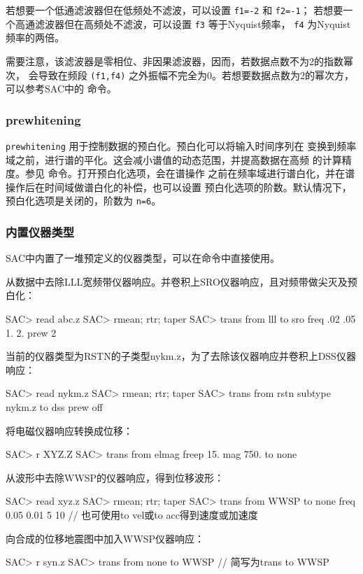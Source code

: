 若想要一个低通滤波器但在低频处不滤波，可以设置 \texttt{f1=-2} 和 \texttt{f2=-1}；
若想要一个高通滤波器但在高频处不滤波，可以设置 \texttt{f3} 等于Nyquist频率，
\texttt{f4} 为Nyquist频率的两倍。

需要注意，该滤波器是零相位、非因果滤波器，因而，若数据点数不为2的指数幂次，
会导致在频段 \texttt{(f1,f4)} 之外振幅不完全为0。若想要数据点数为2的幂次方，
可以参考SAC中的  命令。

\subsubsection{prewhitening}
\texttt{prewhitening} 用于控制数据的预白化。预白化可以将输入时间序列在
变换到频率域之前，进行谱的平化。这会减小谱值的动态范围，并提高数据在高频
的计算精度。参见  命令。打开预白化选项，会在谱操作
之前在频率域进行谱白化，并在谱操作后在时间域做谱白化的补偿，也可以设置
预白化选项的阶数。默认情况下，预白化选项是关闭的，阶数为 \texttt{n=6}。

\subsubsection{内置仪器类型}
SAC中内置了一堆预定义的仪器类型，可以在命令中直接使用。

从数据中去除LLL宽频带仪器响应。并卷积上SRO仪器响应，且对频带做尖灭及预白化：
\begin{SACCode}
SAC> read abc.z
SAC> rmean; rtr; taper
SAC> trans from lll to sro freq .02 .05 1. 2. prew 2
\end{SACCode}

当前的仪器类型为RSTN的子类型nykm.z，为了去除该仪器响应并卷积上DSS仪器响应：
\begin{SACCode}
SAC> read nykm.z
SAC> rmean; rtr; taper
SAC> trans from rstn subtype nykm.z to dss prew off
\end{SACCode}

将电磁仪器响应转换成位移：
\begin{SACCode}
SAC> r XYZ.Z
SAC> trans from elmag freep 15. mag 750. to none
\end{SACCode}

从波形中去除WWSP的仪器响应，得到位移波形：
\begin{SACCode}
SAC> read xyz.z
SAC> rmean; rtr; taper
SAC> trans from WWSP to none freq 0.05 0.01 5 10
                // 也可使用to vel或to acc得到速度或加速度
\end{SACCode}

向合成的位移地震图中加入WWSP仪器响应：
\begin{SACCode}
SAC> r syn.z
SAC> trans from none to WWSP    // 简写为trans to WWSP
\end{SACCode}

